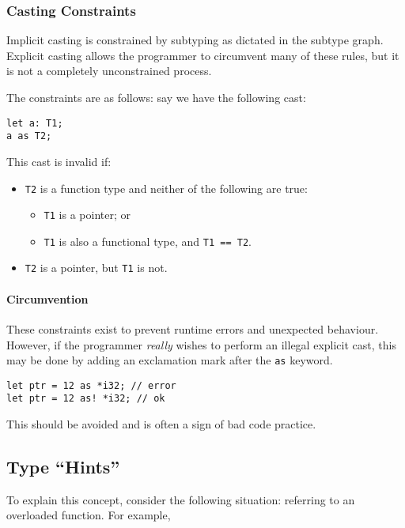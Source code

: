 \subsubsection{Casting Constraints}

Implicit casting is constrained by subtyping as dictated in the subtype graph.
Explicit casting allows the programmer to circumvent many of these rules, but it is not a completely unconstrained process.

The constraints are as follows: say we have the following cast:
\begin{lstlisting}[language=CustomLang]
let a: T1;
a as T2;
\end{lstlisting}

This cast is invalid if:
\begin{itemize}
    \item \texttt{T2} is a function type and neither of the following are true:
    \begin{itemize}
        \item \texttt{T1} is a pointer; or
        \item \texttt{T1} is also a functional type, and \texttt{T1 == T2}.
    \end{itemize}
    \item \texttt{T2} is a pointer, but \texttt{T1} is not.
\end{itemize}

\paragraph*{Circumvention}

These constraints exist to prevent runtime errors and unexpected behaviour.
However, if the programmer \textit{really} wishes to perform an illegal explicit cast, this may be done by adding an exclamation mark after the \texttt{as} keyword.

\begin{lstlisting}[language=CustomLang]
let ptr = 12 as *i32; // error
let ptr = 12 as! *i32; // ok
\end{lstlisting}

This should be avoided and is often a sign of bad code practice.

\subsection{Type ``Hints''}\label{subsec:type-hints}

To explain this concept, consider the following situation: referring to an overloaded function.
For example,

